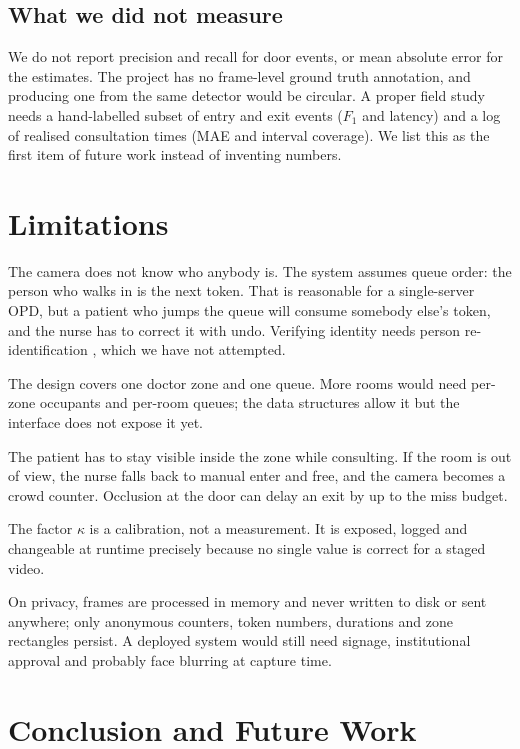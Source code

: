 \documentclass[conference]{IEEEtran}
\begin{document}
\subsection{What we did not measure}
We do not report precision and recall for door events, or mean absolute error
for the estimates. The project has no frame-level ground truth annotation, and
producing one from the same detector would be circular. A proper field study
needs a hand-labelled subset of entry and exit events ($F_1$ and latency) and a
log of realised consultation times (MAE and interval coverage). We list this as
the first item of future work instead of inventing numbers.

\section{Limitations}
\label{sec:limits}

The camera does not know who anybody is. The system assumes queue order: the
person who walks in is the next token. That is reasonable for a single-server
OPD, but a patient who jumps the queue will consume somebody else's token, and
the nurse has to correct it with undo. Verifying identity needs person
re-identification \cite{zheng2016reid}, which we have not attempted.

The design covers one doctor zone and one queue. More rooms would need
per-zone occupants and per-room queues; the data structures allow it but the
interface does not expose it yet.

The patient has to stay visible inside the zone while consulting. If the room
is out of view, the nurse falls back to manual enter and free, and the camera
becomes a crowd counter. Occlusion at the door can delay an exit by up to the
miss budget.

The factor $\kappa$ is a calibration, not a measurement. It is exposed, logged
and changeable at runtime precisely because no single value is correct for a
staged video.

On privacy, frames are processed in memory and never written to disk or sent
anywhere; only anonymous counters, token numbers, durations and zone rectangles
persist. A deployed system would still need signage, institutional approval and
probably face blurring at capture time.

\section{Conclusion and Future Work}
\label{sec:concl}
\end{document}
